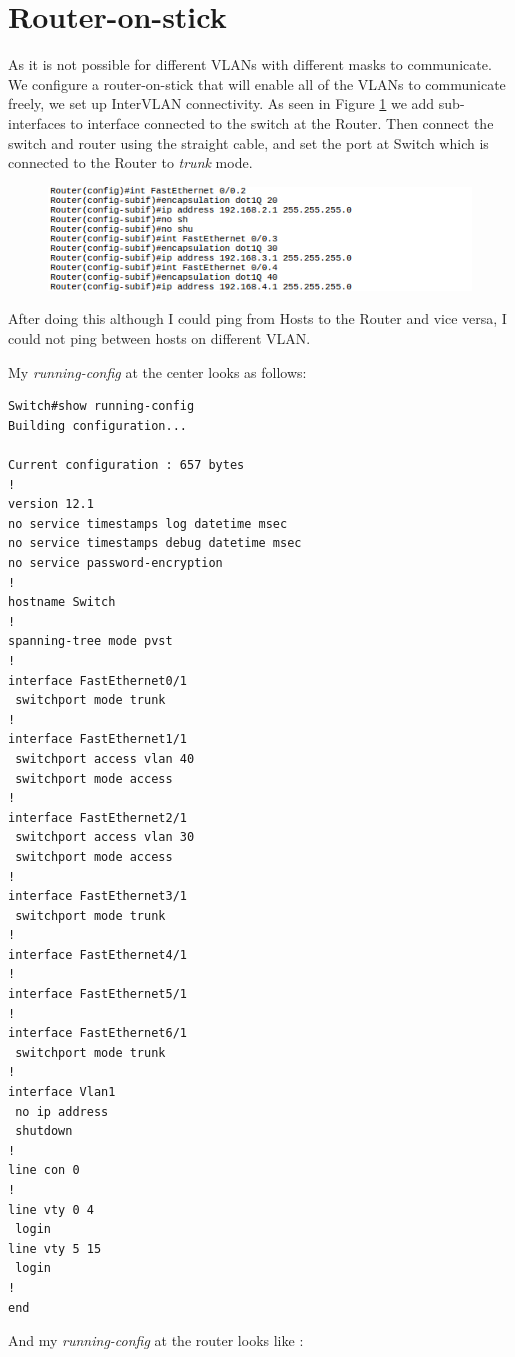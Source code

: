 \documentclass{article}
\begin{document}
\section{Router-on-stick}

As it is not possible for different VLANs with different masks to communicate. We configure a router-on-stick that will enable all of the VLANs to communicate freely, we set up InterVLAN connectivity.  As seen in Figure \ref{fig:routerconf} we add sub-interfaces to interface connected to the switch at the Router. Then connect the switch and router using the straight cable, and set the port at Switch which is connected to the Router to \textit{trunk} mode.  


\begin{figure}[h]
    \centering
    \includegraphics[width=\textwidth]{5routerconf}
    \caption{}
    \label{fig:routerconf}
\end{figure}

After doing this although I could ping from Hosts to the Router and vice versa, I could not ping between hosts on  different VLAN. 

 
 My \textit{running-config} at the center looks as follows:
\begin{verbatim}
Switch#show running-config 
Building configuration...

Current configuration : 657 bytes
!
version 12.1
no service timestamps log datetime msec
no service timestamps debug datetime msec
no service password-encryption
!
hostname Switch
!
spanning-tree mode pvst
!
interface FastEthernet0/1
 switchport mode trunk
!
interface FastEthernet1/1
 switchport access vlan 40
 switchport mode access
!
interface FastEthernet2/1
 switchport access vlan 30
 switchport mode access
!
interface FastEthernet3/1
 switchport mode trunk
!
interface FastEthernet4/1
!
interface FastEthernet5/1
!
interface FastEthernet6/1
 switchport mode trunk
!
interface Vlan1
 no ip address
 shutdown
!
line con 0
!
line vty 0 4
 login
line vty 5 15
 login
!
end
\end{verbatim}


And my \textit{running-config} at the router looks like : 
\end{document}
